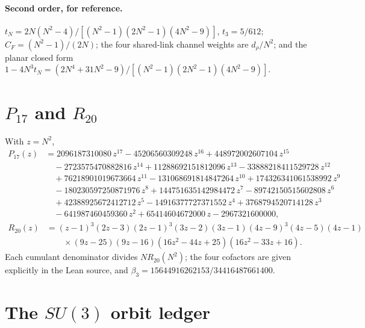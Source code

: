 \documentclass[11pt]{article}
\theoremstyle{definition}
\theoremstyle{remark}
\newcommand{\CF}{C_F}
\begin{document}
\paragraph{Second order, for reference.}
$t_N=2N(N^2-4)/[(N^2-1)(2N^2-1)(4N^2-9)]$, $t_3=5/612$;
$\CF=(N^2-1)/(2N)$; the four shared-link channel weights are $d_\rho/N^2$; and
the planar closed form
$1-4N^3t_N=(2N^4+31N^2-9)/[(N^2-1)(2N^2-1)(4N^2-9)]$.

\section{$P_{17}$ and $R_{20}$}\label{app:p17}

With $z=N^2$,
\begin{align*}
 P_{17}(z)&=2096187310080\,z^{17}-45206560309248\,z^{16}+448972002607104\,z^{15}\\
 &\quad-2723575470882816\,z^{14}+11288692151812096\,z^{13}-33888218411529728\,z^{12}\\
 &\quad+76218901019673664\,z^{11}-131068691814847264\,z^{10}+174326341061538992\,z^{9}\\
 &\quad-180230597250871976\,z^{8}+144751635142984472\,z^{7}-89742150515602808\,z^{6}\\
 &\quad+42388925672412712\,z^{5}-14916377727371552\,z^{4}+3768794520714128\,z^{3}\\
 &\quad-641987460459360\,z^{2}+65414604672000\,z-2967321600000,
\end{align*}
\begin{align*}
 R_{20}(z)&=(z-1)^3(2z-3)(2z-1)^3(3z-2)(3z-1)(4z-9)^3(4z-5)(4z-1)\\
 &\qquad\times(9z-25)(9z-16)(16z^2-44z+25)(16z^2-33z+16).
\end{align*}
Each cumulant denominator divides $NR_{20}(N^2)$; the four cofactors are given
explicitly in the Lean source, and $\beta_3=15644916262153/34416487661400$.

\section{The $SU(3)$ orbit ledger}\label{app:ledger}
\end{document}
